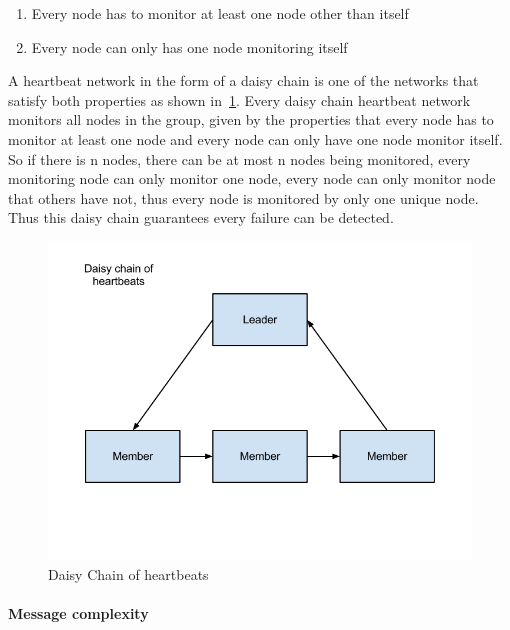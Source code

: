 \begin{enumerate}
\item Every node has to monitor at least one node other than itself
\item Every node can only has one node monitoring itself
\end{enumerate}


A heartbeat network in the form of a daisy chain is one of the networks that
satisfy both properties as shown in~\ref{fig:daisy-chain}. Every daisy chain
heartbeat network monitors all nodes in the group, given by the properties that
every node has to monitor at least one node and every node can only have one
node monitor itself. So if there is n nodes, there can be at most n nodes being
monitored, every monitoring node can only monitor one node, every node can only
monitor node that others have not, thus every node is monitored by only one
unique node. Thus this daisy chain guarantees every failure can be detected.

\begin{figure}[h!]
\caption{Daisy Chain of heartbeats}
\label{fig:daisy-chain}
\centering
    \includegraphics[width=\linewidth]{figures/daisy-chain}
\end{figure}

\paragraph{Message complexity}

